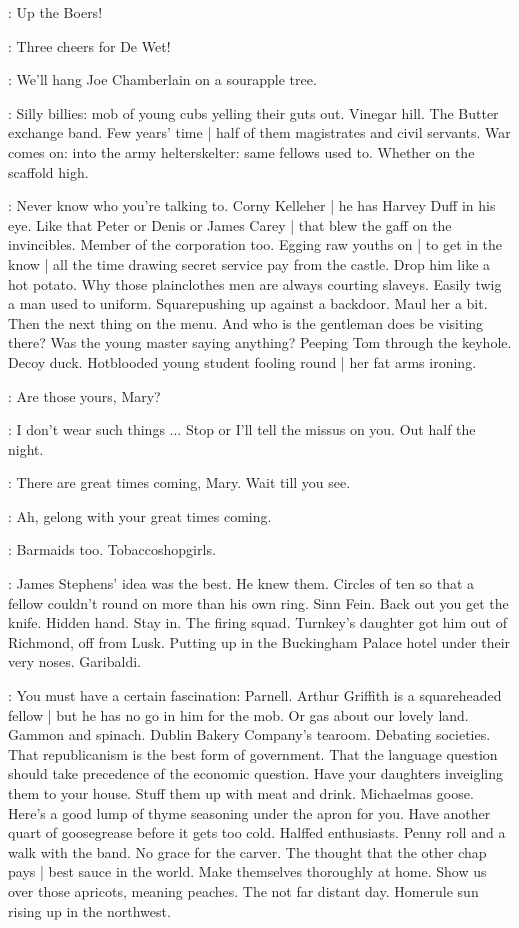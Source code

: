 \men:
Up the Boers!

\men:
Three cheers for De Wet!

\men:
We'll hang Joe Chamberlain on a sourapple tree.

\BloomInt:
Silly billies:
mob of young cubs yelling their guts out.
Vinegar hill.
The Butter exchange band.
Few years' time |
half of them magistrates and civil servants.
War comes on:
into the army helterskelter:
same fellows used to.
Whether on the scaffold high.

\BloomInt:
Never know who you're talking to.
Corny Kelleher |
he has Harvey Duff in his eye.
Like that Peter or Denis or James Carey |
that blew the gaff on the invincibles.
Member of the corporation too.
Egging raw youths on |
to get in the know |
all the time drawing secret service pay from the castle.
Drop him like a hot potato.
Why those plainclothes men are always courting slaveys.
Easily twig a man used to uniform.
Squarepushing up
against a backdoor.
Maul her a bit.
Then the next thing on the menu.
And who is the gentleman does be visiting there?
Was the young master saying anything?
Peeping Tom through the keyhole.
Decoy duck.
Hotblooded young student fooling round |
her fat arms ironing.

\policeman:
Are those yours,
Mary?

\mary:
I don't wear such things ...
Stop or I'll tell the missus on you.
Out half the night.

\policeman:
There are great times coming,
Mary.
Wait till you see.

\mary:
Ah,
gelong with your great times coming.

\BloomInt:
Barmaids too.
Tobaccoshopgirls.

\BloomInt:
James Stephens' idea was the best.
He knew them.
Circles of ten so
that a fellow couldn't round on more than his own ring.
Sinn Fein.
Back out you get the knife.
Hidden hand.
Stay in.
The firing squad.
Turnkey's daughter got him out of Richmond,
off from Lusk.
Putting up in the Buckingham Palace hotel under their very noses.
Garibaldi.

\BloomInt:
You must have a certain fascination:
Parnell.
Arthur Griffith is a squareheaded fellow |
but he has no go in him for the mob.
Or gas about our lovely land.
Gammon and spinach.
Dublin Bakery Company's tearoom.
Debating societies.
That republicanism is the best form of government.
That the language question should take precedence of the economic question.
Have your daughters inveigling them to your house.
Stuff them up with meat and drink.
Michaelmas goose.
Here's a good lump of thyme seasoning under the apron for you.
Have another quart of goosegrease before it gets too cold.
Half\/fed enthusiasts.
Penny roll and a walk with the band.
No grace for the carver.
The thought that the other chap pays |
best sauce in the world.
Make themselves thoroughly at home.
Show us over those apricots,
meaning peaches.
The not far distant day.
Homerule sun rising up in the northwest.


